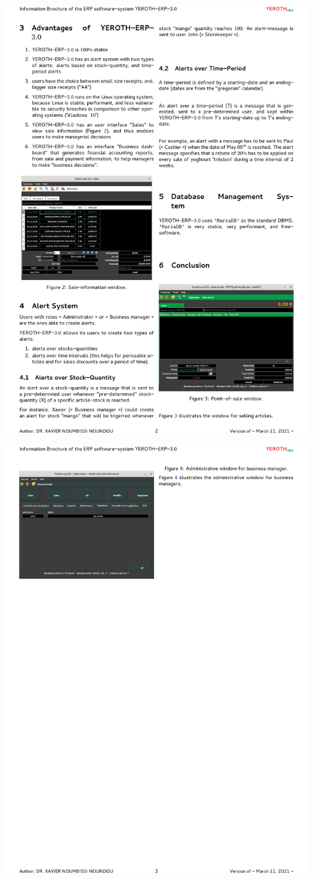 \includegraphics[scale=0.93]{images/2_yeroth-erp-3-0-brochure-english.pdf}

\includegraphics[scale=0.93]{images/3_yeroth-erp-3-0-brochure-english.pdf}

